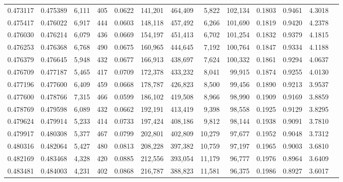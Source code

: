 \begin{tabular}{rrrrrrrrrrrrr}
0.473117 & 0.475389 &  6,111 &   405 &                                     0.0622 & 141,201 & 464,409 &   5,822 & 102,134 & 0.1803 & 0.9461 & 4.3018 \\
0.475417 & 0.476022 &  6,917 &   444 &                                     0.0603 & 148,118 & 457,492 &   6,266 & 101,690 & 0.1819 & 0.9420 & 4.2378 \\
0.476030 & 0.476214 &  6,079 &   436 &                                     0.0669 & 154,197 & 451,413 &   6,702 & 101,254 & 0.1832 & 0.9379 & 4.1815 \\
0.476253 & 0.476368 &  6,768 &   490 &                                     0.0675 & 160,965 & 444,645 &   7,192 & 100,764 & 0.1847 & 0.9334 & 4.1188 \\
0.476379 & 0.476645 &  5,948 &   432 &                                     0.0677 & 166,913 & 438,697 &   7,624 & 100,332 & 0.1861 & 0.9294 & 4.0637 \\
0.476709 & 0.477187 &  5,465 &   417 &                                     0.0709 & 172,378 & 433,232 &   8,041 &  99,915 & 0.1874 & 0.9255 & 4.0130 \\
0.477196 & 0.477600 &  6,409 &   459 &                                     0.0668 & 178,787 & 426,823 &   8,500 &  99,456 & 0.1890 & 0.9213 & 3.9537 \\
0.477600 & 0.478766 &  7,315 &   466 &                                     0.0599 & 186,102 & 419,508 &   8,966 &  98,990 & 0.1909 & 0.9169 & 3.8859 \\
0.478769 & 0.479598 &  6,089 &   432 &                                     0.0662 & 192,191 & 413,419 &   9,398 &  98,558 & 0.1925 & 0.9129 & 3.8295 \\
0.479624 & 0.479914 &  5,233 &   414 &                                     0.0733 & 197,424 & 408,186 &   9,812 &  98,144 & 0.1938 & 0.9091 & 3.7810 \\
0.479917 & 0.480308 &  5,377 &   467 &                                     0.0799 & 202,801 & 402,809 &  10,279 &  97,677 & 0.1952 & 0.9048 & 3.7312 \\
0.480316 & 0.482064 &  5,427 &   480 &                                     0.0813 & 208,228 & 397,382 &  10,759 &  97,197 & 0.1965 & 0.9003 & 3.6810 \\
0.482169 & 0.483468 &  4,328 &   420 &                                     0.0885 & 212,556 & 393,054 &  11,179 &  96,777 & 0.1976 & 0.8964 & 3.6409 \\
0.483481 & 0.484003 &  4,231 &   402 &                                     0.0868 & 216,787 & 388,823 &  11,581 &  96,375 & 0.1986 & 0.8927 & 3.6017 \\

\end{tabular}
